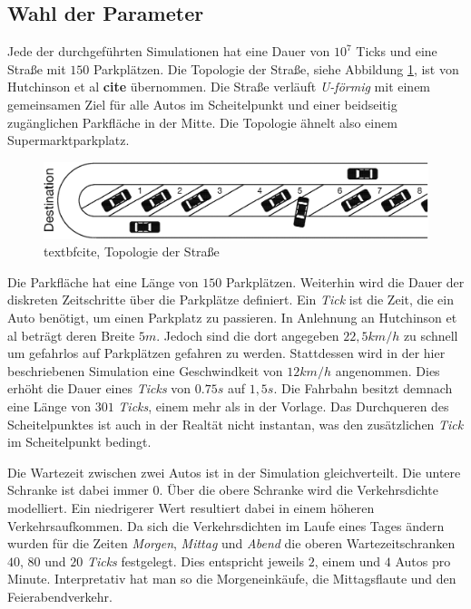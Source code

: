 \subsection{Wahl der Parameter}
Jede der durchgeführten Simulationen hat eine Dauer von $10^7$ Ticks und eine Straße mit $150$ Parkplätzen. Die Topologie der Straße, siehe Abbildung \ref{fig_street}, ist von Hutchinson et al \textbf{cite} übernommen. Die Straße verläuft \emph{U-förmig} mit einem gemeinsamen Ziel für alle Autos im Scheitelpunkt und einer beidseitig zugänglichen Parkfläche in der Mitte. Die Topologie ähnelt also einem Supermarktparkplatz. 
\begin{figure}
\includegraphics[width=\textwidth]{pics/street.png}
\caption{textbf{cite}, Topologie der Straße}\label{fig_street}
\end{figure}
 Die Parkfläche hat eine Länge von $150$ Parkplätzen. Weiterhin wird die Dauer der diskreten Zeitschritte über die Parkplätze definiert. Ein \emph{Tick} ist die Zeit, die ein Auto benötigt, um einen Parkplatz zu passieren. 
In Anlehnung an Hutchinson et al beträgt deren Breite $5m$. Jedoch sind die dort angegeben $22,5 km/h$ zu schnell um gefahrlos auf Parkplätzen gefahren zu werden. Stattdessen wird in der hier beschriebenen Simulation eine Geschwindkeit von $12km/h$ angenommen. Dies erhöht die Dauer eines \emph{Ticks} von $0.75s$ auf $1,5s$. Die Fahrbahn besitzt demnach eine Länge von $301$ \emph{Ticks}, einem mehr als in der Vorlage. Das Durchqueren des Scheitelpunktes ist auch in der Realtät nicht instantan, was den zusätzlichen \emph{Tick} im Scheitelpunkt bedingt. 

Die Wartezeit zwischen zwei Autos ist in der Simulation gleichverteilt. Die untere Schranke ist dabei immer $0$. Über die obere Schranke wird die Verkehrsdichte modelliert. Ein niedrigerer Wert resultiert dabei in einem höheren Verkehrsaufkommen. Da sich die Verkehrsdichten im Laufe eines Tages ändern wurden für die Zeiten \emph{Morgen}, \emph{Mittag} und \emph{Abend} die oberen Wartezeitschranken $40$, $80$ und $20$ \emph{Ticks} festgelegt. Dies entspricht jeweils $2$, einem und $4$ Autos pro Minute. Interpretativ hat man so die Morgeneinkäufe, die Mittagsflaute und den Feierabendverkehr. 

